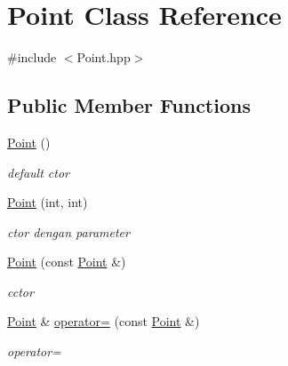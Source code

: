 \hypertarget{classPoint}{}\section{Point Class Reference}
\label{classPoint}


{\ttfamily \#include $<$Point.\+hpp$>$}

\subsection*{Public Member Functions}
\begin{DoxyCompactItemize}
\item 
\mbox{\label{classPoint_ad92f2337b839a94ce97dcdb439b4325a}} 
\hyperlink{classPoint_ad92f2337b839a94ce97dcdb439b4325a}{Point} ()
\begin{DoxyCompactList}\small\item\em default ctor \end{DoxyCompactList}\item 
\mbox{\label{classPoint_a7e2f39fba71990705aac9ffee1b389b4}} 
\hyperlink{classPoint_a7e2f39fba71990705aac9ffee1b389b4}{Point} (int, int)
\begin{DoxyCompactList}\small\item\em ctor dengan parameter \end{DoxyCompactList}\item 
\mbox{\label{classPoint_a5b7ec0fb127734c1cd5c6f350a3990fc}} 
\hyperlink{classPoint_a5b7ec0fb127734c1cd5c6f350a3990fc}{Point} (const \hyperlink{classPoint}{Point} \&)
\begin{DoxyCompactList}\small\item\em cctor \end{DoxyCompactList}\item 
\mbox{\label{classPoint_aecfc6968998d806384e24cd93072b024}} 
\hyperlink{classPoint}{Point} \& \hyperlink{classPoint_aecfc6968998d806384e24cd93072b024}{operator=} (const \hyperlink{classPoint}{Point} \&)
\begin{DoxyCompactList}\small\item\em operator= \end{DoxyCompactList}\item 
\mbox{\label{classPoint_ac9d5859db121c7d1b89ca89266dca0a3}} 

\end{DoxyCompactItemize}

